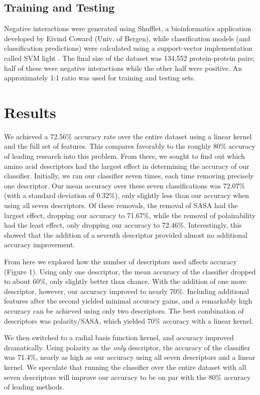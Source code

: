\documentclass{acm_proc_article-sp}
\begin{document}
\subsection{Training and Testing}
Negative interactions were generated using Shufflet, a bioinformatics application developed by Eivind Coward (Univ. of Bergen), while classification models (and classification predictions) were calculated using a support-vector implementation called SVM light \cite{Joachims}. The final size of the dataset was 134,552 protein-protein pairs; half of these were negative interactions while the other half were positive. An approximately 1:1 ratio was used for training and testing sets.

\section{Results}
We achieved a 72.56\% accuracy rate over the entire dataset using a linear kernel and the full set of features. This compares favorably to the roughly 80\% accuracy of leading research into this problem. From there, we sought to find out which amino acid descriptors had the largest effect in determining the accuracy of our classifier. Initially, we ran our classifier seven times, each time removing precisely one descriptor. Our mean accuracy over these seven classifications was 72.07\% (with a standard deviation of 0.32\%), only slightly less than our accuracy when using all seven descriptors. Of these removals, the removal of SASA had the largest effect, dropping our accuracy to 71.67\%, while the removal of polaizability had the least effect, only dropping our accuracy to 72.46\%. Interestingly, this showed that the addition of a seventh descriptor provided almost no additional accuracy improvement.

From here we explored how the number of descriptors used affects accuracy (Figure 1). Using only one descriptor, the mean accuracy of the classifier dropped to about 60\%, only slightly better than chance. With the addition of one more descriptor, however, our accuracy improved to nearly 70\%. Including additional features after the second yielded minimal accuracy gains, and a remarkably high accuracy can be achieved using only two descriptors. The best combination of descriptors was polarity/SASA, which yielded 70\% accuracy with a linear kernel.

We then switched to a radial basis function kernel, and accuracy improved dramatically. Using polarity as the \emph{only} descriptor, the accuracy of the classifier was 71.4\%, nearly as high as our accuracy using all seven descriptors and a linear kernel. We speculate that running the classifier over the entire dataset with all seven descriptors will improve our accuracy to be on par with the 80\% accuracy of leading methods.
\end{document}
